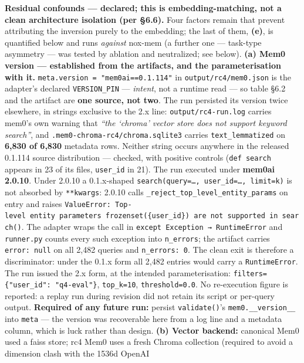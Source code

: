 \documentclass[
]{article}
\begin{document}
\textbf{Residual confounds --- declared; this is embedding-matching, not
a clean architecture isolation (per §6.6).} Four factors remain that
prevent attributing the inversion purely to the embedding; the last of
them, \textbf{(e)}, is quantified below and runs \emph{against} nox-mem
(a further one --- task-type asymmetry --- was tested by ablation and
neutralized; see below). \textbf{(a) Mem0 version --- established from
the artifacts, and the parameterisation with it.}
\texttt{meta.version\ =\ "mem0ai==0.1.114"} in
\texttt{output/rc4/mem0.json} is the adapter's declared
\texttt{VERSION\_PIN} --- \emph{intent}, not a runtime read --- so table
§6.2 and the artifact are \textbf{one source, not two}. The run
persisted its version twice elsewhere, in strings exclusive to the 2.x
line: \texttt{output/rc4-run.log} carries mem0's own warning that
\emph{``the `chroma' vector store does not support keyword search''},
and \texttt{.mem0-chroma-rc4/chroma.sqlite3} carries
\texttt{text\_lemmatized} on \textbf{6,830 of 6,830} metadata rows.
Neither string occurs anywhere in the released 0.1.114 source
distribution --- checked, with positive controls (\texttt{def\ search}
appears in 23 of its files, \texttt{user\_id} in 21). The run executed
under \textbf{mem0ai 2.0.10}. Under 2.0.10 a 0.1.x-shaped
\texttt{search(query=…,\ user\_id=…,\ limit=k)} is not absorbed by
\texttt{**kwargs}: 2.0.10 calls
\texttt{\_reject\_top\_level\_entity\_params} on entry and raises
\texttt{ValueError:\ Top-level\ entity\ parameters\ frozenset(\{\textquotesingle{}user\_id\textquotesingle{}\})\ are\ not\ supported\ in\ search()}.
The adapter wraps the call in
\texttt{except\ Exception\ →\ RuntimeError} and \texttt{runner.py}
counts every such exception into \texttt{n\_errors}; the artifact
carries \texttt{error:\ null} on all 2,482 queries and
\texttt{n\_errors:\ 0}. The clean exit is therefore a discriminator:
under the 0.1.x form all 2,482 entries would carry a
\texttt{RuntimeError}. The run issued the 2.x form, at the intended
parameterisation: \texttt{filters=\{"user\_id":\ "q4-eval"\}},
\texttt{top\_k=10}, \texttt{threshold=0.0}. No re-execution figure is
reported: a replay run during revision did not retain its script or
per-query output. \textbf{Required of any future run:} persist
\texttt{validate()}'s \texttt{mem0.\_\_version\_\_} into \texttt{meta}
--- the version was recoverable here from a log line and a metadata
column, which is luck rather than design. \textbf{(b) Vector backend:}
canonical Mem0 used a faiss store; rc4 Mem0 uses a fresh Chroma
collection (required to avoid a dimension clash with the 1536d OpenAI
\end{document}
